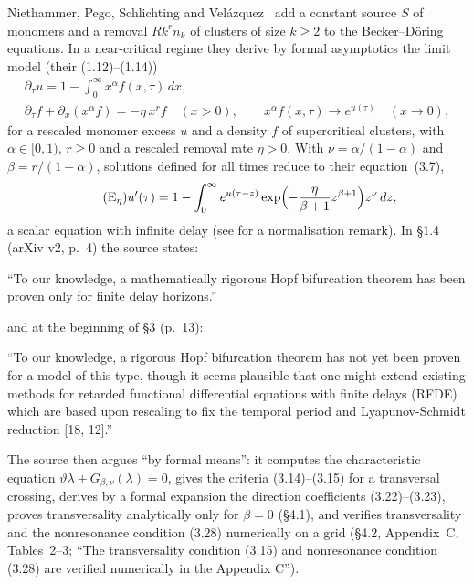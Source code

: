 \documentclass[11pt,a4paper]{report}
\newcommand{\vth}{\vartheta}
\begin{document}
Niethammer, Pego, Schlichting and Velázquez~\autocite{NPSV2022} add a constant source $S$ of monomers and a removal $Rk^r n_k$ of clusters of size $k\ge2$ to the Becker--Döring equations. In a near-critical regime they derive by formal asymptotics the limit model (their (1.12)--(1.14))
\begin{equation}\label{eq:limit}
\begin{gathered}
\partial_\tau u=1-\int_0^\infty x^\alpha f(x,\tau)\,dx,\\
\partial_\tau f+\partial_x(x^\alpha f)=-\eta\,x^r f\quad(x>0),\qquad
x^\alpha f(x,\tau)\to e^{u(\tau)}\quad(x\to0),
\end{gathered}
\end{equation}
for a rescaled monomer excess $u$ and a density $f$ of supercritical clusters, with $\alpha\in[0,1)$, $r\ge0$ and a rescaled removal rate $\eta>0$. With $\nu=\alpha/(1-\alpha)$ and $\beta=r/(1-\alpha)$, solutions defined for all times reduce to their equation~(3.7),
\begin{equation}\label{eq:E}\tag{E$_\eta$}
u'(\tau)=1-\int_0^\infty e^{u(\tau-z)}\exp\Bigl(-\frac{\eta}{\beta+1}z^{\beta+1}\Bigr)z^\nu\,dz,
\end{equation}
a scalar equation with infinite delay (see  for a normalisation remark). In \S1.4 (arXiv v2, p.~4) the source states:
\begin{openquote}
``To our knowledge, a mathematically rigorous Hopf bifurcation theorem has been proven only for finite delay horizons.''
\end{openquote}
and at the beginning of \S3 (p.~13):
\begin{openquote}
``To our knowledge, a rigorous Hopf bifurcation theorem has not yet been proven for a model of this type, though it seems plausible that one might extend existing methods for retarded functional differential equations with finite delays (RFDE) which are based upon rescaling to fix the temporal period and Lyapunov-Schmidt reduction [18, 12].''
\end{openquote}
The source then argues ``by formal means'': it computes the characteristic equation $\vth\lambda+G_{\beta,\nu}(\lambda)=0$, gives the criteria (3.14)--(3.15) for a transversal crossing, derives by a formal expansion the direction coefficients (3.22)--(3.23), proves transversality analytically only for $\beta=0$ (\S4.1), and verifies transversality and the nonresonance condition (3.28) numerically on a grid (\S4.2, Appendix~C, Tables~2--3; ``The transversality condition (3.15) and nonresonance condition (3.28) are verified numerically in the Appendix C'').
\end{document}
